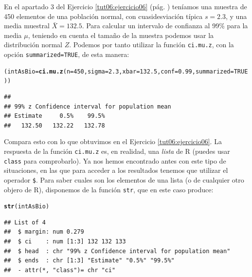 \documentclass[10pt,a4paper]{article}\usepackage[]{graphicx}\usepackage[]{color}
\makeatletter
\newcommand{\hlnum}[1]{\textcolor[rgb]{0.686,0.059,0.569}{#1}}%
\newcommand{\hlstd}[1]{\textcolor[rgb]{0.345,0.345,0.345}{#1}}%
\newcommand{\hlkwb}[1]{\textcolor[rgb]{0.69,0.353,0.396}{#1}}%
\newcommand{\hlkwc}[1]{\textcolor[rgb]{0.333,0.667,0.333}{#1}}%
\newcommand{\hlkwd}[1]{\textcolor[rgb]{0.737,0.353,0.396}{\textbf{#1}}}%
\newenvironment{kframe}{%
 \def\at@end@of@kframe{}%
 \ifinner\ifhmode%
  \def\at@end@of@kframe{\end{minipage}}%
  \begin{minipage}{\columnwidth}%
 \fi\fi%
 \def\FrameCommand##1{\hskip\@totalleftmargin \hskip-\fboxsep
 \colorbox{shadecolor}{##1}\hskip-\fboxsep
     \hskip-\linewidth \hskip-\@totalleftmargin \hskip\columnwidth}%
 \MakeFramed {\advance\hsize-\width
   \@totalleftmargin\z@ \linewidth\hsize
   \@setminipage}}%
 {\par\unskip\endMakeFramed%
 \at@end@of@kframe}
\newenvironment{knitrout}{}{} %
\newcounter {cont01}
\makeatother
\begin{document}
En el apartado 3 del Ejercicio \ref{tut06:ejercicio06} (pág. \pageref{tut06:ejercicio06}) teníamos una muestra de 450 elementos de una población normal, con cuasidesviación típica $s=2.3$, y una media muestral $\bar X=132.5$. Para calcular un intervalo de confianza al 99\% para la media $\mu$, teniendo en cuenta el tamaño de la muestra podemos usar la distribución normal $Z$.  Podemos por tanto utilizar la función {\tt ci.mu.z}, con la opción {\tt summarized=TRUE}, de esta manera:
\begin{knitrout}
\color{fgcolor}\begin{kframe}
\begin{alltt}
\hlstd{(intAsBio} \hlkwb{=} \hlkwd{ci.mu.z}\hlstd{(}\hlkwc{n}\hlstd{=}\hlnum{450}\hlstd{,} \hlkwc{sigma}\hlstd{=}\hlnum{2.3}\hlstd{,} \hlkwc{xbar}\hlstd{=}\hlnum{132.5}\hlstd{,} \hlkwc{conf}\hlstd{=}\hlnum{0.99}\hlstd{,} \hlkwc{summarized}\hlstd{=}\hlnum{TRUE}\hlstd{))}
\end{alltt}
\begin{verbatim}
## 
## 99% z Confidence interval for population mean 
## Estimate     0.5%    99.5% 
##   132.50   132.22   132.78
\end{verbatim}
\end{kframe}
\end{knitrout}
Compara esto con lo que obtuvimos en el Ejercicio \ref{tut06:ejercicio06}. La respuesta de la función {\tt ci.mu.z} es, en realidad, una {\em lista} de R (puedes usar {\tt class} para comprobarlo). Ya nos hemos encontrado antes con este tipo de situaciones, en las que para acceder a los resultados tenemos que utilizar el operador \verb/$/. Para saber cuales son los elementos de una lista (o de cualquier otro objero de R), disponemos de la función {\tt str}, que en este caso produce:
\begin{knitrout}
\color{fgcolor}\begin{kframe}
\begin{alltt}
\hlkwd{str}\hlstd{(intAsBio)}
\end{alltt}
\begin{verbatim}
## List of 4
##  $ margin: num 0.279
##  $ ci    : num [1:3] 132 132 133
##  $ head  : chr "99% z Confidence interval for population mean"
##  $ ends  : chr [1:3] "Estimate" "0.5%" "99.5%"
##  - attr(*, "class")= chr "ci"
\end{verbatim}
\end{kframe}
\end{knitrout}
\end{document}
